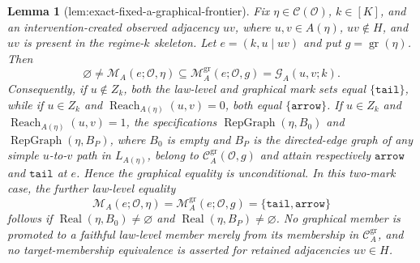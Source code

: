 \documentclass{article}
\newtheorem{lemma}{Lemma}
\begin{document}
\begin{lemma}[lem:exact-fixed-a-graphical-frontier]\label{lem:exact-fixed-a-graphical-frontier}
Fix \(\eta\in\mathcal C(\mathcal O)\), \(k\in[K]\), and an intervention-created observed adjacency \(uv\), where \(u,v\in A(\eta)\), \(uv\notin H\), and \(uv\) is present in the regime-\(k\) skeleton.  Let \(e=(k,u\mid uv)\) and put \(g=\operatorname{gr}(\eta)\).  Then
\[
 \varnothing\ne
 \mathcal M_A(e;\mathcal O,\eta)
 \subseteq
 \mathcal M_A^{\mathrm{gr}}(e;\mathcal O,g)
 =\mathcal G_A(u,v;k).
\]
Consequently, if \(u\notin Z_k\), both the law-level and graphical mark sets equal \(\{\mathtt{tail}\}\), while if \(u\in Z_k\) and \(\operatorname{Reach}_{A(\eta)}(u,v)=0\), both equal \(\{\mathtt{arrow}\}\).  If \(u\in Z_k\) and \(\operatorname{Reach}_{A(\eta)}(u,v)=1\), the specifications \(\operatorname{RepGraph}(\eta,B_0)\) and \(\operatorname{RepGraph}(\eta,B_P)\), where \(B_0\) is empty and \(B_P\) is the directed-edge graph of any simple \(u\)-to-\(v\) path in \(L_{A(\eta)}\), belong to \(\mathcal C_A^{\mathrm{gr}}(\mathcal O,g)\) and attain respectively \(\mathtt{arrow}\) and \(\mathtt{tail}\) at \(e\).  Hence the graphical equality is unconditional.  In this two-mark case, the further law-level equality
\[
 \mathcal M_A(e;\mathcal O,\eta)
 =\mathcal M_A^{\mathrm{gr}}(e;\mathcal O,g)
 =\{\mathtt{tail},\mathtt{arrow}\}
\]
follows if \(\operatorname{Real}(\eta,B_0)\ne\varnothing\) and \(\operatorname{Real}(\eta,B_P)\ne\varnothing\).  No graphical member is promoted to a faithful law-level member merely from its membership in \(\mathcal C_A^{\mathrm{gr}}\), and no target-membership equivalence is asserted for retained adjacencies \(uv\in H\).
\end{lemma}
\end{document}
